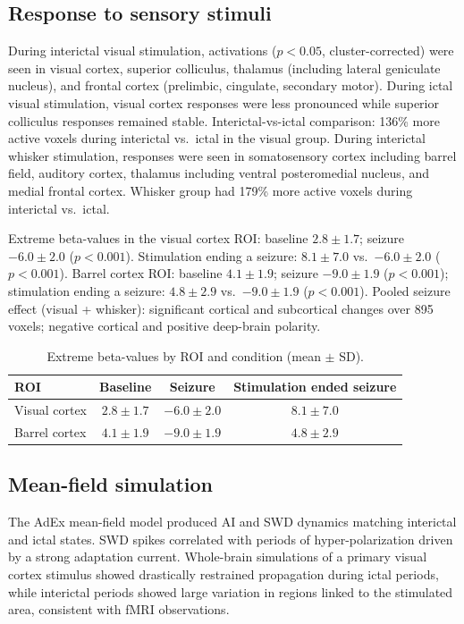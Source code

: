 \documentclass[11pt]{article}
\begin{document}
\subsection{Response to sensory stimuli}
During interictal visual stimulation, activations ($p<0.05$, cluster-corrected) were seen in visual cortex, superior colliculus, thalamus (including lateral geniculate nucleus), and frontal cortex (prelimbic, cingulate, secondary motor). During ictal visual stimulation, visual cortex responses were less pronounced while superior colliculus responses remained stable. Interictal-vs-ictal comparison: 136\% more active voxels during interictal vs.\ ictal in the visual group. During interictal whisker stimulation, responses were seen in somatosensory cortex including barrel field, auditory cortex, thalamus including ventral posteromedial nucleus, and medial frontal cortex. Whisker group had 179\% more active voxels during interictal vs.\ ictal.

Extreme beta-values in the visual cortex ROI: baseline $2.8 \pm 1.7$; seizure $-6.0 \pm 2.0$ ($p<0.001$). Stimulation ending a seizure: $8.1 \pm 7.0$ vs.\ $-6.0 \pm 2.0$ ($p<0.001$). Barrel cortex ROI: baseline $4.1 \pm 1.9$; seizure $-9.0 \pm 1.9$ ($p<0.001$); stimulation ending a seizure: $4.8 \pm 2.9$ vs.\ $-9.0 \pm 1.9$ ($p<0.001$). Pooled seizure effect (visual + whisker): significant cortical and subcortical changes over 895 voxels; negative cortical and positive deep-brain polarity.

\begin{table}[h]
\centering
\caption{Extreme beta-values by ROI and condition (mean $\pm$ SD).}
\begin{tabular}{lccc}
\toprule
ROI & Baseline & Seizure & Stimulation ended seizure \\
\midrule
Visual cortex & $2.8 \pm 1.7$ & $-6.0 \pm 2.0$ & $8.1 \pm 7.0$ \\
Barrel cortex & $4.1 \pm 1.9$ & $-9.0 \pm 1.9$ & $4.8 \pm 2.9$ \\
\bottomrule
\end{tabular}
\end{table}

\subsection{Mean-field simulation}
The AdEx mean-field model produced AI and SWD dynamics matching interictal and ictal states. SWD spikes correlated with periods of hyper-polarization driven by a strong adaptation current. Whole-brain simulations of a primary visual cortex stimulus showed drastically restrained propagation during ictal periods, while interictal periods showed large variation in regions linked to the stimulated area, consistent with fMRI observations.
\end{document}
